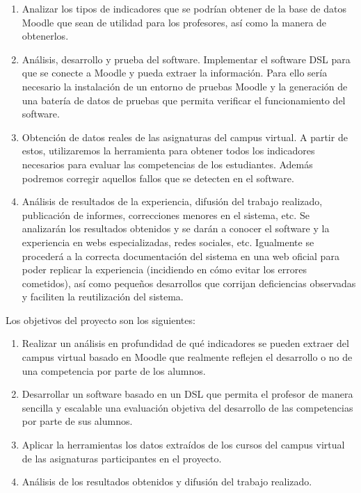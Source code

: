 \begin{enumerate}
\item Analizar los tipos de indicadores que se podrían obtener de la base de datos Moodle que sean de utilidad para los profesores, así como la manera de obtenerlos.
\item Análisis, desarrollo y prueba del software. Implementar el software DSL para que se conecte a Moodle y pueda extraer la información. Para ello sería necesario la instalación de un entorno de pruebas Moodle y la generación de una batería de datos de pruebas que permita verificar el funcionamiento del software.
\item Obtención de datos reales de las asignaturas del campus virtual. A partir de estos, utilizaremos la herramienta para obtener todos los indicadores necesarios para evaluar las competencias de los estudiantes. Además podremos corregir aquellos fallos que se detecten en el software.
\item Análisis de resultados de la experiencia, difusión del trabajo realizado, publicación de informes, correcciones menores en el sistema, etc. Se analizarán los resultados obtenidos y se darán a conocer el software y la experiencia en webs especializadas, redes sociales, etc. Igualmente se procederá a la correcta documentación del sistema en una web oficial para poder replicar la experiencia (incidiendo en cómo evitar los errores cometidos), así como pequeños desarrollos que corrijan deficiencias observadas y faciliten la reutilización del sistema.
\end{enumerate}

Los objetivos del proyecto son los siguientes:
\begin{enumerate}
\item Realizar un análisis en profundidad de qué indicadores se pueden extraer del campus virtual basado en Moodle que realmente reflejen el desarrollo o no de una competencia por parte de los alumnos.
\item Desarrollar un software basado en un DSL que permita el profesor de manera sencilla y escalable una evaluación objetiva del desarrollo de las competencias por parte de sus alumnos.
\item Aplicar la herramientas los datos extraídos de los cursos del campus virtual de las asignaturas participantes en el proyecto.
\item Análisis de los resultados obtenidos y difusión del trabajo realizado.
\end{enumerate}



